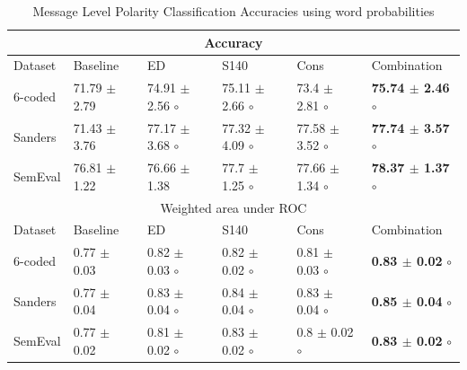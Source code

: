 \documentclass{sig-alternate}
\begin{document}
\begin{table}[htbp]

\begin{center}
\begin{tabular}{l|l|l|l|l|l}
\hline \hline
\multicolumn{ 6}{c}{Accuracy } \\ \hline \hline
Dataset & Baseline & ED & S140 & Cons & Combination \\ \hline
6-coded & 71.79 $\pm$ 2.79 & 74.91 $\pm$ 2.56 $\circ$ & 75.11 $\pm$ 2.66 $\circ$ & 73.4 $\pm$ 2.81 $\circ$ & \textbf{75.74 $\pm$ 2.46} $\circ$ \\ 
Sanders & 71.43 $\pm$ 3.76 & 77.17 $\pm$ 3.68 $\circ$ & 77.32 $\pm$ 4.09 $\circ$ & 77.58 $\pm$ 3.52 $\circ$ & \textbf{77.74 $\pm$ 3.57} $\circ$ \\ 
SemEval & 76.81 $\pm$ 1.22 & 76.66 $\pm$ 1.38 & 77.7 $\pm$ 1.25 $\circ$ & 77.66 $\pm$ 1.34 $\circ$ & \textbf{78.37 $\pm$ 1.37} $\circ$ \\ \hline \hline
\multicolumn{ 6}{c}{Weighted area under ROC } \\ \hline \hline
Dataset & Baseline & ED & S140 & Cons & Combination \\ \hline
6-coded & 0.77 $\pm$ 0.03 & 0.82 $\pm$ 0.03 $\circ$ & 0.82 $\pm$ 0.02 $\circ$ & 0.81 $\pm$ 0.03 $\circ$ & \textbf{0.83 $\pm$ 0.02} $\circ$ \\ 
Sanders & 0.77 $\pm$ 0.04 & 0.83 $\pm$ 0.04 $\circ$ & 0.84 $\pm$ 0.04 $\circ$ & 0.83 $\pm$ 0.04 $\circ$ & \textbf{0.85 $\pm$ 0.04} $\circ$ \\ 
SemEval & 0.77 $\pm$ 0.02 & 0.81 $\pm$ 0.02 $\circ$ & 0.83 $\pm$ 0.02 $\circ$ & 0.8 $\pm$ 0.02 $\circ$ & \textbf{0.83 $\pm$ 0.02} $\circ$ \\ \hline
\end{tabular}
\caption{Message Level Polarity Classification Accuracies using word probabilities}
\end{center}
\label{}
\end{table}
\end{document}
